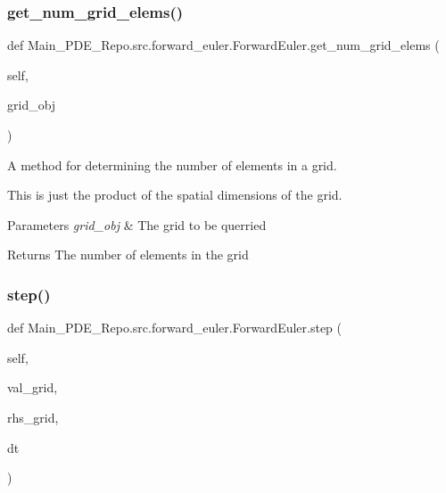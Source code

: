 \subsubsection{\texorpdfstring{get\+\_\+num\+\_\+grid\+\_\+elems()}{get\_num\_grid\_elems()}}
{\footnotesize\ttfamily def Main\+\_\+\+P\+D\+E\+\_\+\+Repo.\+src.\+forward\+\_\+euler.\+Forward\+Euler.\+get\+\_\+num\+\_\+grid\+\_\+elems (\begin{DoxyParamCaption}\item[{}]{self,  }\item[{}]{grid\+\_\+obj }\end{DoxyParamCaption})}



A method for determining the number of elements in a grid. 

This is just the product of the spatial dimensions of the grid. 
\begin{DoxyParams}{Parameters}
{\em grid\+\_\+obj} & The grid to be querried \\
\hline
\end{DoxyParams}
\begin{DoxyReturn}{Returns}
The number of elements in the grid 
\end{DoxyReturn}
\mbox{\label{classMain__PDE__Repo_1_1src_1_1forward__euler_1_1ForwardEuler_aafec83c8cc54107baf7aa842563199b0}} 
\subsubsection{\texorpdfstring{step()}{step()}}
{\footnotesize\ttfamily def Main\+\_\+\+P\+D\+E\+\_\+\+Repo.\+src.\+forward\+\_\+euler.\+Forward\+Euler.\+step (\begin{DoxyParamCaption}\item[{}]{self,  }\item[{}]{val\+\_\+grid,  }\item[{}]{rhs\+\_\+grid,  }\item[{}]{dt }\end{DoxyParamCaption})}



